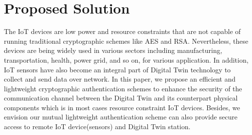 \section{Proposed Solution}

The IoT devices are low power and resource constraints that are not capable of running traditional cryptographic schemes like AES and RSA. Nevertheless, these devices are being widely used in various sectors including manufacturing, transportation, health, power grid, and so on, for various application. In addition, IoT sensors have also become an integral part of Digital Twin technology to collect and send data over network. In this paper, we propose an efficient and lightweight cryptographic authentication schemes to enhance the security of the communication channel between the Digital Twin and its counterpart physical components which is in most cases resource constraint IoT devices. Besides, we envision our mutual lightweight authentication scheme can also provide secure access to remote IoT device(sensors) and  Digital Twin station.